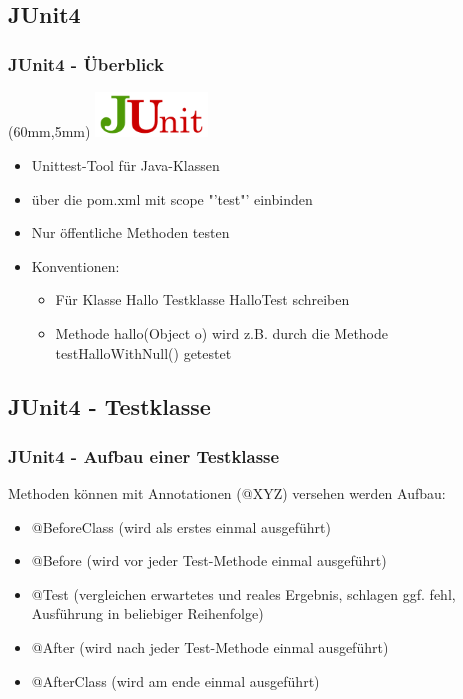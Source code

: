 \documentclass[18pt]{beamer}
\begin{document}
	\subsection{JUnit4}
	\begin{frame}
		\frametitle{JUnit4 - Überblick}
		\begin{textblock*}{20mm}(60mm,5mm)
			\includegraphics[width=30mm, scale=0.8]{./pics/tut0/junit-logo.png}
		\end{textblock*}
		\begin{itemize}
			\item Unittest-Tool für Java-Klassen
			\item über die pom.xml mit scope "'test"' einbinden
			\item Nur öffentliche Methoden testen
			\item Konventionen:
			 \begin{itemize}
			 		\item Für Klasse Hallo Testklasse HalloTest schreiben
			 		\item Methode hallo(Object o) wird z.B. durch die Methode testHalloWithNull() getestet
			 \end{itemize}
		\end{itemize}
	\end{frame}	
	
	\subsection{JUnit4 - Testklasse}
	\begin{frame}
		\frametitle{JUnit4 - Aufbau einer Testklasse}
		Methoden können mit Annotationen (@XYZ) versehen werden \linebreak
		Aufbau:
		\begin{itemize}
			\item @BeforeClass (wird als erstes einmal ausgeführt)
			\pause
			\item @Before (wird vor jeder Test-Methode einmal ausgeführt)
			\pause
			\item @Test (vergleichen erwartetes und reales Ergebnis, schlagen ggf. fehl, Ausführung in beliebiger Reihenfolge)
			\pause
			\item @After (wird nach jeder Test-Methode einmal ausgeführt)
			\pause
			\item @AfterClass (wird am ende einmal ausgeführt)
		\end{itemize}
	\end{frame}
	
\end{document}
